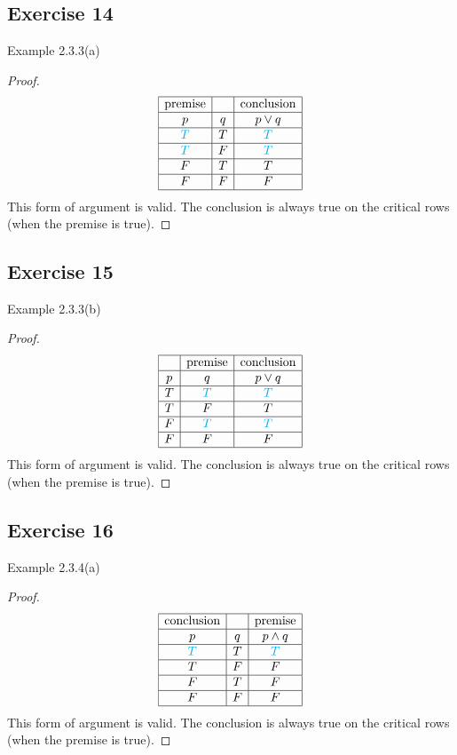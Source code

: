 \documentclass[14pt]{extarticle}
\begin{document}
\subsection{Exercise 14} Example 2.3.3(a)
\begin{proof} $$ \begin{array}{|c|c|c|} \hline \text{premise} & &
\text{conclusion}\\ \hline p & q & p \vee q \\ \hline \color{cyan} T & T &
\color{cyan} T \\ \hline \color{cyan} T & F & \color{cyan} T \\ \hline F & T & T
\\ \hline F & F & F \\ \hline \end{array} $$ This form of argument is valid. The
conclusion is always true on the critical rows (when the premise is true).
\end{proof}

\subsection{Exercise 15} Example 2.3.3(b)
\begin{proof} $$ \begin{array}{|c|c|c|} \hline & \text{premise} &
\text{conclusion}\\ \hline p & q & p \vee q \\ \hline T & \color{cyan} T &
\color{cyan} T \\ \hline T & F & T \\ \hline F & \color{cyan} T & \color{cyan} T
\\ \hline F & F & F \\ \hline \end{array} $$ This form of argument is valid. The
conclusion is always true on the critical rows (when the premise is true).
\end{proof}

\subsection{Exercise 16} Example 2.3.4(a)
\begin{proof} $$ \begin{array}{|c|c|c|} \hline \text{conclusion} & &
\text{premise} \\ \hline p & q & p \wedge q \\ \hline \color{cyan} T & T &
\color{cyan} T \\ \hline T & F & F \\ \hline F & T & F \\ \hline F & F & F \\
\hline \end{array} $$ This form of argument is valid. The conclusion is always
true on the critical rows (when the premise is true). \end{proof}
\end{document}

